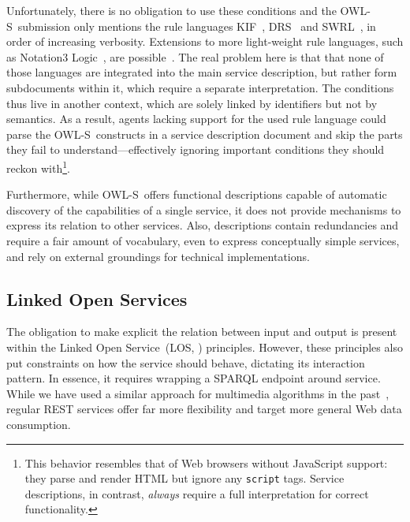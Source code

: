 \documentclass[runningheads,a4paper, twocolumn]{llncs}
\newcommand{\owls}{\mbox{OWL-S}}
\begin{document}
Unfortunately, there is no obligation to use these conditions and the \owls\ submission only mentions the rule languages KIF~\cite{KIF}, DRS~\cite{DRS} and SWRL~\cite{SWRL}, in order of increasing verbosity. Extensions to more light-weight rule languages, such as Notation3 Logic~\cite{N3Logic}, are possible~\cite{Verborgh:2010p2746}. The real problem here is that that none of those languages are integrated into the main service description, but rather form subdocuments within it, which require a separate interpretation. The conditions thus live in another context, which are solely linked by identifiers but not by semantics. As a result, agents lacking support for the used rule language could parse the \owls\ constructs in a service description document and skip the parts they fail to understand---effectively ignoring important conditions they should reckon with\footnote{This behavior resembles that of Web browsers without JavaScript support: they parse and render HTML but ignore any \Verb!script! tags. Service descriptions, in contrast, {\em always} require a full interpretation for correct functionality.}.

Furthermore, while \owls\ offers functional descriptions capable of automatic discovery of the capabilities of a single service, it does not provide mechanisms to express its relation to other services. Also, descriptions contain redundancies and require a fair amount of vocabulary, even to express conceptually simple services, and rely on external groundings for technical implementations.

\subsection{Linked Open Services}
The obligation to make explicit the relation between input and output is present within the Linked Open Service~(LOS, \cite{Krummenacher:2010p5107}) principles. However, these principles also put constraints on how the service should behave, dictating its interaction pattern. In essence, it requires wrapping a SPARQL endpoint around service. While we have used a similar approach for multimedia algorithms in the past~\cite{Verborgh:2010p2746}, regular REST services offer far more flexibility and target more general Web data consumption.
\end{document}
